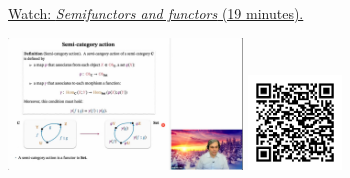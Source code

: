 
\begin{minipage}{10cm}
    \href{https://act4e-spring21.netlify.app/videos/spring2021-functors:semi-and-fun.html}{Watch: \emph{Semifunctors and functors} (19 minutes).}
        
    \href{https://act4e-spring21.netlify.app/videos/spring2021-functors:semi-and-fun.html}{\includegraphics[height=3.5cm]{spring2021-functors:semi-and-fun/thumbnails.jpg}}
    \href{https://act4e-spring21.netlify.app/videos/spring2021-functors:semi-and-fun.html}{\includegraphics[height=2.5cm]{spring2021-functors:semi-and-fun/qrcode.png}}
\end{minipage}
